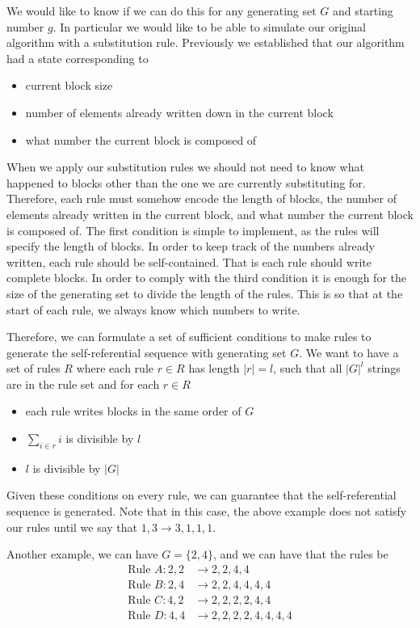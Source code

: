 \documentclass[runningheads,a4paper]{llncs}
\begin{document}
We would like to know if we can do this for any generating set $G$ and starting number $g$. In particular we would like to be able to simulate our original algorithm with a substitution rule. Previously we established that our algorithm had a state corresponding to 
\begin{itemize}
\item current block size
\item number of elements already written down in the current block
\item what number the current block is composed of 
\end{itemize}

When we apply our substitution rules we should not need to know what happened to blocks other than the one we are currently substituting for. Therefore, each rule must somehow encode the length of  blocks, the number of elements already written in the current block, and what number the current block is composed of. The first condition is simple to implement, as the rules will specify the length of blocks. In order to keep track of the numbers already written, each rule should be self-contained. That is each rule should write complete blocks. In order to comply with the third condition it is enough for the size of the generating set to divide the length of the rules. This is so that at the start of each rule, we always know which numbers to write.

Therefore, we can formulate a set of sufficient conditions to make rules to generate the self-referential sequence with generating set $G$. We want to have a set of rules $R$ where each rule $r \in R$ has length $|r| = l$, such that all $|G|^{l}$ strings are in the rule set and for each $r \in R$
\begin{itemize}
\item each rule writes blocks in the same order of $G$
\item $\sum_{i \in r} i$ is divisible by $l$
\item $l$ is divisible by $|G|$
\end{itemize}
Given these conditions on every rule, we can guarantee that the self-referential sequence is generated. Note that in this case, the above example does not satisfy our rules until we say that $1, 3 \to 3, 1, 1, 1$.

Another example, we can have $G = \{ 2, 4 \}$, and we can have that the rules be
\begin{align*}
\text{Rule }A: 2,2 &\to 2, 2, 4, 4 \\
\text{Rule }B: 2,4 &\to 2, 2, 4,4,4,4\\
\text{Rule }C: 4,2 &\to 2,2,2,2,4,4\\
\text{Rule }D: 4,4 &\to 2, 2, 2, 2, 4, 4, 4, 4
\end{align*}
\end{document}
